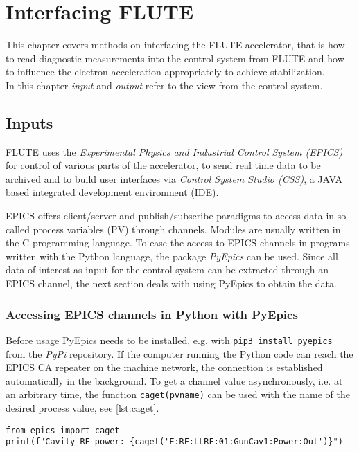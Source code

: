 \chapter{Interfacing FLUTE}
This chapter covers methods on interfacing the FLUTE accelerator, that is how to read diagnostic measurements into the control system from FLUTE and how to influence the electron acceleration appropriately to achieve stabilization.\\
In this chapter \textit{input} and \textit{output} refer to the view from the control system.

\section{Inputs}
FLUTE uses the \textit{Experimental Physics and Industrial Control System (EPICS)}\cite{Dalesio1991} for control of various parts of the accelerator, to send real time data to be archived and to build user interfaces via \textit{Control System Studio (CSS)}\cite{CSS2021}, a JAVA based integrated development environment (IDE).

EPICS offers client/server and publish/subscribe paradigms to access data in so called process variables (PV) through channels. Modules are usually written in the C programming language. To ease the access to EPICS channels in programs written with the Python language, the package \textit{PyEpics}\cite{Newville2019} can be used. Since all data of interest as input for the control system can be extracted through an EPICS channel, the next section deals with using PyEpics to obtain the data.

\subsection{Accessing EPICS channels in Python with PyEpics}
Before usage PyEpics needs to be installed, e.g. with \texttt{pip3 install pyepics} from the \textit{PyPi} repository. If the computer running the Python code can reach the EPICS CA repeater on the machine network, the connection is established automatically in the background. To get a channel value asynchronously, i.e. at an arbitrary time, the function \texttt{caget(pvname)} can be used with the name of the desired process value, see \autoref{lst:caget}.

\begin{lstlisting}[style=python,caption = Using \texttt{caget()} to get the value of an EPICS process value, label = lst:caget]
from epics import caget
print(f"Cavity RF power: {caget('F:RF:LLRF:01:GunCav1:Power:Out')}")
\end{lstlisting}


